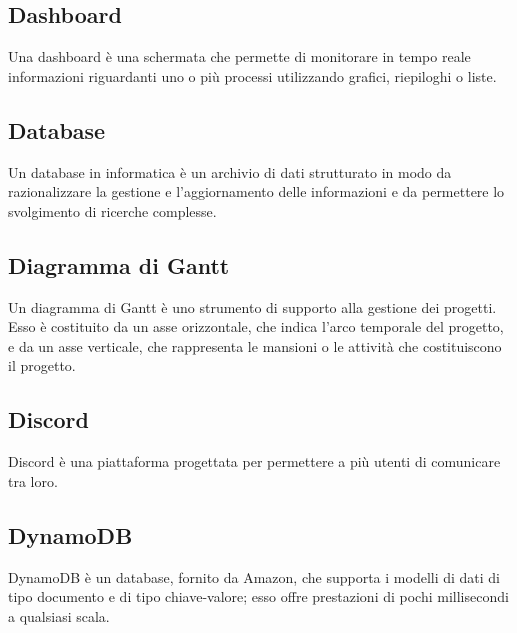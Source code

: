 
\subsection*{Dashboard}
Una dashboard è una schermata che permette di monitorare in tempo reale informazioni riguardanti uno o più processi utilizzando grafici, riepiloghi o liste.

\subsection*{Database}
Un database in informatica è un archivio di dati strutturato in modo da razionalizzare la gestione e l'aggiornamento delle informazioni e da permettere lo svolgimento di ricerche complesse.

\subsection*{Diagramma di Gantt}
Un diagramma di Gantt è uno strumento di supporto alla gestione dei progetti. Esso è costituito da un asse orizzontale, che indica l'arco temporale del progetto, e da un asse verticale, che rappresenta le mansioni o le attività che costituiscono il progetto.

\subsection*{Discord}
Discord è una piattaforma progettata per permettere a più utenti di comunicare tra loro.

\subsection*{DynamoDB}
DynamoDB è un database, fornito da Amazon, che supporta i modelli di dati di tipo documento e di tipo chiave-valore; esso offre prestazioni di pochi millisecondi a qualsiasi scala.


